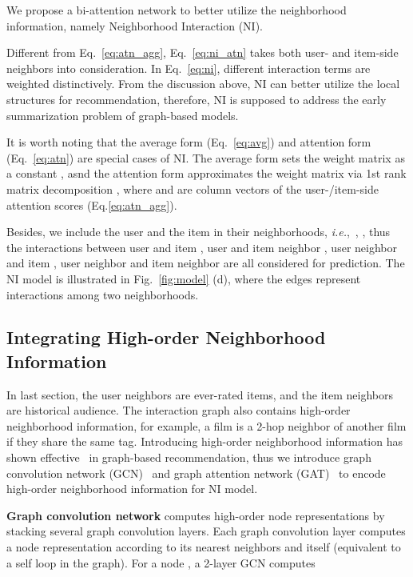 \documentclass[sigconf]{acmart}
\newcommand{\new}[1]{{\color{black} #1}}
\newcommand{\ie}{\emph{i.e.},~}
\begin{document}
We propose a bi-attention network to better utilize the neighborhood information, namely Neighborhood Interaction (NI).


Different from Eq.~\eqref{eq:atn_agg}, Eq.~\eqref{eq:ni_atn} takes both user- and item-side neighbors into consideration.
In Eq.~\eqref{eq:ni}, different interaction terms are weighted distinctively. From the discussion above, NI can better utilize the local structures for recommendation, therefore, NI is supposed to address the early summarization problem of graph-based models.

It is worth noting that the average form (Eq.~\eqref{eq:avg}) and attention form (Eq.~\eqref{eq:atn}) are special cases of NI. The average form sets the weight matrix as a constant , asnd the attention form approximates the weight matrix via 1st rank matrix decomposition , where  and  are column vectors of the user-/item-side attention scores (Eq.\eqref{eq:atn_agg}). 

Besides, we include the user and the item in their neighborhoods, \ie , , thus the interactions between user and item , user and item neighbor , user neighbor and item , user neighbor and item neighbor  are all considered for prediction.
The NI model is illustrated in Fig.~\ref{fig:model} (d), where the edges represent interactions among two neighborhoods.

\subsection{Integrating High-order Neighborhood Information}\label{sec:high-order}

\new{In last section, the user neighbors are ever-rated items, and the item neighbors are historical audience. The interaction graph  also contains high-order neighborhood information, for example, a film is a 2-hop neighbor of another film if they share the same tag. Introducing high-order neighborhood information has shown effective~\cite{van2017graph,ying2018graph,wang2017graphgan} in graph-based recommendation, thus we introduce graph convolution network (GCN)~\cite{kipf2016semi} and graph attention network (GAT)~\cite{velickovic2017graph} to encode high-order neighborhood information for NI model.}

\textbf{Graph convolution network} computes high-order node representations by stacking several graph convolution layers. Each graph convolution layer computes a node representation according to its nearest neighbors and itself (equivalent to a self loop in the graph). For a node , a 2-layer GCN computes
\end{document}
